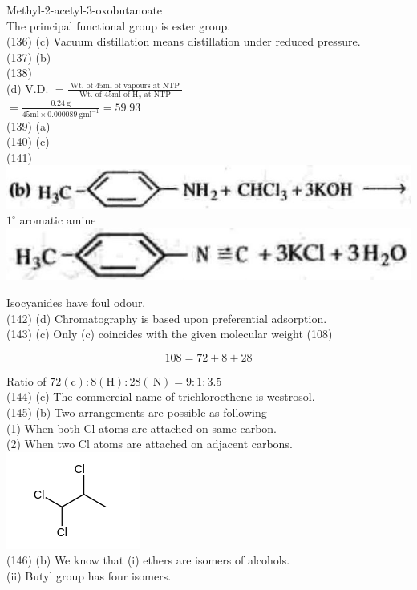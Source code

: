 \documentclass[10pt]{article}
\begin{document}
Methyl-2-acetyl-3-oxobutanoate\\
The principal functional group is ester group.\\
(136) (c) Vacuum distillation means distillation under reduced pressure.\\
(137) (b)\\
(138)\\
(d) V.D. $=\frac{\text { Wt. of } 45 \mathrm{ml} \text { of vapours at NTP }}{\text { Wt. of } 45 \mathrm{ml} \text { of } \mathrm{H}_{2} \text { at NTP }}$\\
$=\frac{0.24 \mathrm{~g}}{45 \mathrm{ml} \times 0.000089 \mathrm{~g} \mathrm{ml}^{-1}}=59.93$\\
(139) (a)\\
(140) (c)\\
(141)\\
\includegraphics[max width=\textwidth, center]{2025_01_28_8470952b98110cec3aabg-163(3)}\\
$1^{\circ}$ aromatic amine\\
\includegraphics[max width=\textwidth, center]{2025_01_28_8470952b98110cec3aabg-163(1)}

Isocyanides have foul odour.\\
(142) (d) Chromatography is based upon preferential adsorption.\\
(143) (c) Only (c) coincides with the given molecular weight (108)

$$
108=72+8+28
$$

Ratio of $72(\mathrm{c}): 8(\mathrm{H}): 28(\mathrm{~N})=9: 1: 3.5$\\
(144) (c) The commercial name of trichloroethene is westrosol.\\
(145) (b) Two arrangements are possible as following -\\
(1) When both Cl atoms are attached on same carbon.\\
(2) When two Cl atoms are attached on adjacent carbons.\\
\includegraphics{smile-443b1eeecf9d08052d003504f489bb8c8791b20e}\\
(146) (b) We know that (i) ethers are isomers of alcohols.\\
(ii) Butyl group has four isomers.
\end{document}
